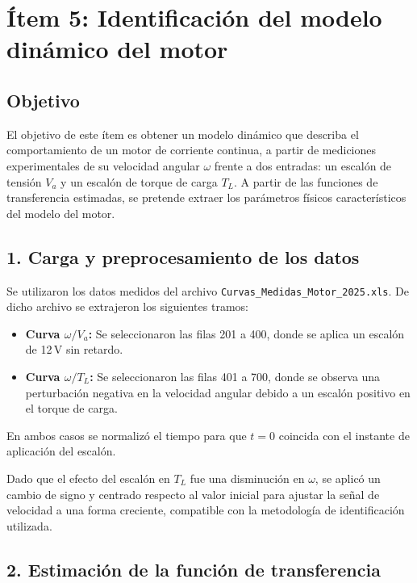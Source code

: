 \documentclass{article}
\begin{document}
\section{Ítem 5: Identificación del modelo dinámico del motor}

\subsection{Objetivo}

El objetivo de este ítem es obtener un modelo dinámico que describa el comportamiento de un motor de corriente continua, a partir de mediciones experimentales de su velocidad angular $\omega$ frente a dos entradas: un escalón de tensión $V_a$ y un escalón de torque de carga $T_L$. A partir de las funciones de transferencia estimadas, se pretende extraer los parámetros físicos característicos del modelo del motor.

\subsection{1. Carga y preprocesamiento de los datos}

Se utilizaron los datos medidos del archivo \texttt{Curvas\_Medidas\_Motor\_2025.xls}. De dicho archivo se extrajeron los siguientes tramos:

\begin{itemize}
    \item \textbf{Curva $\omega / V_a$:} Se seleccionaron las filas 201 a 400, donde se aplica un escalón de 12\,V sin retardo.
    \item \textbf{Curva $\omega / T_L$:} Se seleccionaron las filas 401 a 700, donde se observa una perturbación negativa en la velocidad angular debido a un escalón positivo en el torque de carga.
\end{itemize}

En ambos casos se normalizó el tiempo para que $t = 0$ coincida con el instante de aplicación del escalón.

Dado que el efecto del escalón en $T_L$ fue una disminución en $\omega$, se aplicó un cambio de signo y centrado respecto al valor inicial para ajustar la señal de velocidad a una forma creciente, compatible con la metodología de identificación utilizada.

\subsection{2. Estimación de la función de transferencia}
\end{document}
